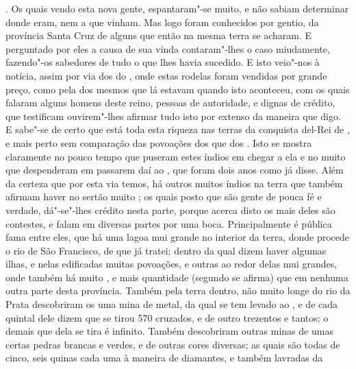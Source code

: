 . Os quais vendo esta nova gente, espantaram"-se muito, e não
sabiam determinar donde eram, nem a que vinham. Mas logo foram
conhecidos por gentio, da província Santa Cruz de alguns 		%
que então na mesma terra se acharam. E perguntado por eles a causa de
sua vinda contaram"-lhes o caso miudamente, fazendo"-os sabedores de tudo
o que lhes havia sucedido. E isto veio"-nos à notícia, assim por via
dos  do , onde estas rodelas foram vendidas por grande
preço, como pela dos mesmos  que lá estavam quando isto
aconteceu, com os quais falaram alguns homens deste reino, pessoas de
autoridade, e dignas de crédito, que testificam ouvirem"-lhes afirmar
tudo isto por extenso da maneira que digo.  E sabe"-se de certo que está
toda esta riqueza nas terras da conquista del-Rei de , e mais
perto sem comparação das povoações dos  que dos .
Isto se mostra claramente no pouco tempo que puseram estes índios em		%
chegar a ela e no muito que despenderam em passarem daí ao , que
foram dois anos como já disse. Além da certeza que por esta via temos,
há outros muitos índios na terra que também afirmam haver no sertão
muito ; os quais posto que são gente de pouca fé e verdade,	%
dá"-se"-lhes crédito nesta parte, porque acerca disto os mais deles são
contestes, e falam em diversas partes por uma boca. Principalmente é
pública fama entre eles, que há uma lagoa mui grande no interior da
terra, donde procede o rio de São Francisco, de que já tratei; dentro		%
da qual dizem haver algumas ilhas, e nelas edificadas muitas povoações,
e outras ao redor delas mui grandes, onde também há muito , e mais
quantidade (segundo se afirma) que em nenhuma outra parte desta
província. Também pela terra dentro, não muito longe do rio da Prata		%
descobriram os  uma mina de metal, da qual se tem levado 
ao , e de cada quintal dele dizem que se tirou 570
cruzados, e de outro trezentos e tantos; o demais que dela se tira é
 infinito. Também descobriram outras minas de umas certas pedras		%
brancas e verdes, e de outras cores diversas; as quais são todas de
cinco, seis quinas cada uma à maneira de diamantes, e também lavradas da		%
